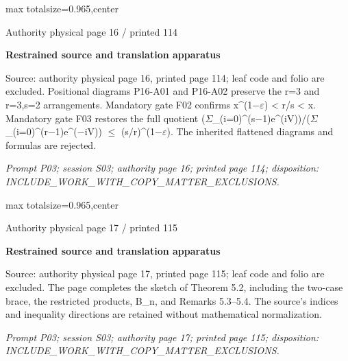 \documentclass{article}
\begin{document}
\newpage
\noindent\begin{adjustbox}{max totalsize={\textwidth}{0.965\textheight},center}\begin{minipage}{\textwidth}
\noindent\hfill\scriptsize Authority physical page 16 / printed 114\par\normalsize
\textbf{Restrained source and translation apparatus}\par
Source: authority physical page 16, printed page 114; leaf code and folio are excluded. Positional diagrams P16-A01 and P16-A02 preserve the r=3 and r=3,s=2 arrangements. Mandatory gate F02 confirms x\textasciicircum{}(1\ensuremath{-}\ensuremath{\varepsilon}) < r/s < x. Mandatory gate F03 restores the full quotient (\ensuremath{\Sigma}\_(i=0)\textasciicircum{}(s\ensuremath{-}1)e\textasciicircum{}(iV))/(\ensuremath{\Sigma}\_(i=0)\textasciicircum{}(r\ensuremath{-}1)e\textasciicircum{}(\ensuremath{-}iV)) \ensuremath{\leq} (s/r)\textasciicircum{}(1\ensuremath{-}\ensuremath{\varepsilon}). The inherited flattened diagrams and formulas are rejected.
\par\smallskip
\textit{Prompt P03; session S03; authority page 16; printed page 114; disposition: INCLUDE\_WORK\_WITH\_COPY\_MATTER\_EXCLUSIONS.}
\end{minipage}\end{adjustbox}

\newpage
\noindent\begin{adjustbox}{max totalsize={\textwidth}{0.965\textheight},center}\begin{minipage}{\textwidth}
\noindent\hfill\scriptsize Authority physical page 17 / printed 115\par\normalsize
\textbf{Restrained source and translation apparatus}\par
Source: authority physical page 17, printed page 115; leaf code and folio are excluded. The page completes the sketch of Theorem 5.2, including the two-case brace, the restricted products, B\_n, and Remarks 5.3–5.4. The source’s indices and inequality directions are retained without mathematical normalization.
\par\smallskip
\textit{Prompt P03; session S03; authority page 17; printed page 115; disposition: INCLUDE\_WORK\_WITH\_COPY\_MATTER\_EXCLUSIONS.}
\end{minipage}\end{adjustbox}
\end{document}
